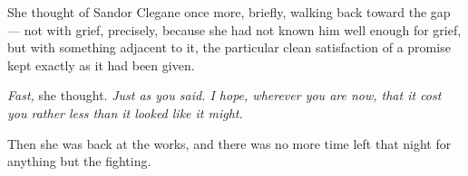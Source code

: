She thought of Sandor Clegane once more, briefly, walking back toward the gap — not with grief, precisely, because she had not known him well enough for grief, but with something adjacent to it, the particular clean satisfaction of a promise kept exactly as it had been given.

\textit{Fast,} she thought. \textit{Just as you said. I hope, wherever you are now, that it cost you rather less than it looked like it might.}

Then she was back at the works, and there was no more time left that night for anything but the fighting.